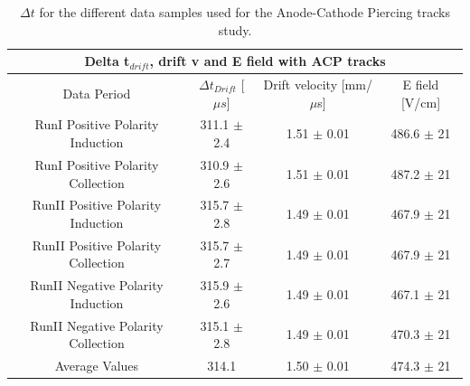\begin{center}
\begin{table}[htb]
  \begin{center}
    \begin{tabular}{|c|c|c|c|}
      \multicolumn{4}{c}{\textbf{Delta t$_{drift}$, drift v and E field with ACP tracks}} \\
      \hline \hline
       Data Period  & $\Delta t_{Drift}$ [$\mu s$] & Drift velocity [mm/$\mu$s] & E field [V/cm] \\
       \hline
       RunI Positive Polarity Induction &  311.1 $\pm$ 2.4   &1.51 $\pm$ 0.01  & 486.6 $\pm$ 21\\
       \hline
       RunI Positive Polarity Collection &  310.9 $\pm$ 2.6 & 1.51 $\pm$ 0.01  &  487.2 $\pm$ 21\\
       \hline
       RunII Positive Polarity Induction &   315.7 $\pm$ 2.8 & 1.49 $\pm$ 0.01 &  467.9 $\pm$ 21\\
       \hline
       RunII Positive Polarity Collection &  315.7 $\pm$ 2.7 & 1.49 $\pm$ 0.01 &  467.9 $\pm$ 21\\
       \hline
       RunII Negative Polarity Induction &   315.9 $\pm$ 2.6 & 1.49 $\pm$ 0.01  & 467.1 $\pm$ 21 \\
       \hline
       RunII Negative Polarity Collection &  315.1 $\pm$ 2.8 & 1.49 $\pm$ 0.01  & 470.3 $\pm$ 21  \\
       \hline
       \hline
       Average Values & 314.1 & 1.50 $\pm$ 0.01 & 474.3 $\pm$ 21 \\
       \hline
       \end{tabular}
    \caption{$\Delta t$ for the different data samples used for the Anode-Cathode Piercing tracks study. }
    \label{tab:deltaTACP}
    \end{center}
\end{table}
\end{center}




